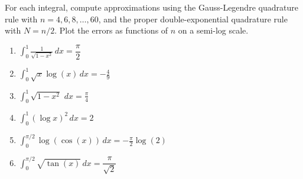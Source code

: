 \begin{exercise}
	For each integral, compute approximations using the Gauss-Legendre quadrature
	rule with $n=4,6,8,\ldots,60$, and the proper double-exponential quadrature rule
	with $N=n/2$. Plot the errors as functions of $n$ on a semi-log scale.
	\begin{enumerate}
		\item $\int_{0}^1 \frac{1}{\sqrt{1-x^2}}\, dx = \dfrac{\pi}{2}$
		\item $\int_0^1 \sqrt{x} \log(x) \, dx = -\frac{4}{9}$
		\item $\int_0^1 \sqrt{1-x^2}\,\, dx = \frac{\pi}{4}$
		\item $\int_{0}^1 (\log x)^2\, dx = 2$
		\item $\int_{0}^{\pi/2} \log(\cos(x))\, dx = -\frac{\pi}{2}\log(2)$
		\item $\int_{0}^{\pi/2} \sqrt{\tan(x)}\, dx = \dfrac{\pi}{\sqrt{2}}$
	\end{enumerate}
\end{exercise}


